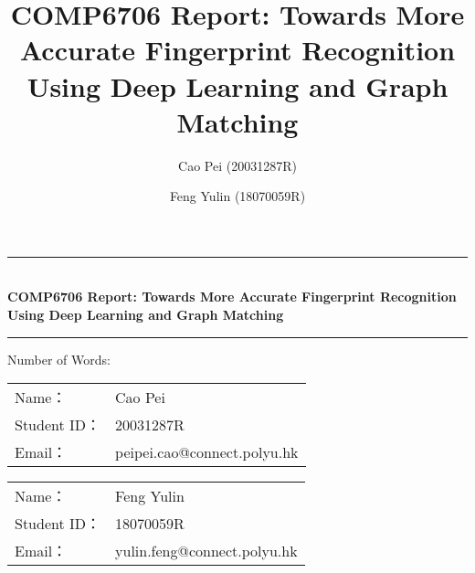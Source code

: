 \documentclass[12pt, a4paper]{article}
\title{COMP6706 Report: Towards More Accurate Fingerprint Recognition Using Deep Learning and Graph Matching}
\author{
    Cao Pei (20031287R) \\
    \text{peipei.cao@connect.polyu.hk}
    \and 
    Feng Yulin (18070059R) \\
    \text{yulin.feng@connect.polyu.hk}
}
\date{}
\newcommand{\horrule}[1]{\rule{\linewidth}{#1}}
\newcommand{\entit}{COMP6706 Report: Towards More Accurate Fingerprint Recognition Using Deep Learning and Graph Matching}
\newcommand{\numword}{Number of Words: }
\begin{document}
\begin{titlepage}
    \begin{center}
        \horrule{0.5pt} \\ [0.4cm]
        \vspace{-1.5ex}
        { \bfseries \entit \\ \vspace{0.4cm}}
          \horrule{2pt} \vspace{-2ex}
        \numword \\
    \end{center}

    \vspace{3cm}
    \begin{table}[h]
        \centering
        \begin{tabular}{p{3cm}<{\raggedleft} p{6cm}<{\centering}}
          Name： & {Cao Pei}            \\
          Student ID： & {20031287R}          \\
          Email： & {peipei.cao@connect.polyu.hk} \\
        \end{tabular}
    \end{table}

    \vspace{3cm}
    \begin{table}[h]
        \centering
        \begin{tabular}{p{3cm}<{\raggedleft} p{6cm}<{\centering}}
          Name： & {Feng Yulin}            \\
          Student ID： & {18070059R}          \\
          Email： & {yulin.feng@connect.polyu.hk} \\
        \end{tabular}
    \end{table}

\end{titlepage}

\newpage

\begin{spacing}{1} 

    
    
    
    
    
     
    




\end{spacing}
\end{document}
